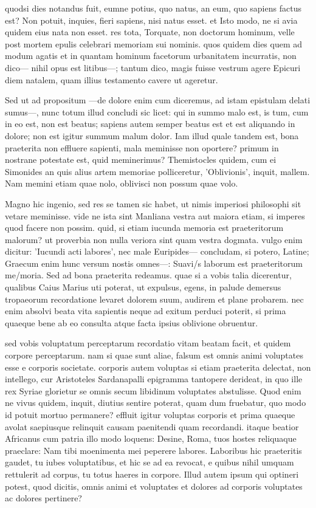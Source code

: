  quodsi dies notandus fuit, eumne potius, quo natus, an eum, quo sapiens factus est? Non potuit, inquies, fieri sapiens, nisi natus esset. et Isto modo, ne si avia quidem eius nata non esset. res tota, Torquate, non doctorum hominum, velle post mortem epulis celebrari memoriam sui nominis. quos quidem dies quem ad modum agatis et in quantam hominum facetorum urbanitatem incurratis, non dico— nihil opus est litibus—; tantum dico, magis fuisse vestrum agere Epicuri diem natalem, quam illius testamento cavere ut ageretur.

 Sed ut ad propositum —de dolore enim cum diceremus, ad istam epistulam delati sumus—, nunc totum illud concludi sic licet: qui in summo malo est, is tum, cum in eo est, non est beatus; sapiens autem semper beatus est et est aliquando in dolore; non est igitur summum malum dolor. Iam illud quale tandem est, bona praeterita non effluere sapienti, mala meminisse non oportere? primum in nostrane potestate est, quid meminerimus? Themistocles quidem, cum ei Simonides an quis alius artem memoriae polliceretur, 'Oblivionis', inquit, mallem. Nam memini etiam quae nolo, oblivisci non possum quae volo.

 Magno hic ingenio, sed res se tamen sic habet, ut nimis imperiosi philosophi sit vetare meminisse. vide ne ista sint Manliana vestra aut maiora etiam, si imperes quod facere non possim. quid, si etiam iucunda memoria est praeteritorum malorum? ut proverbia non nulla veriora sint quam vestra dogmata. vulgo enim dicitur: 'Iucundi acti labores', nec male Euripides— concludam, si potero, Latine; Graecum enim hunc versum nostis omnes—: Suavi/s laborum est praeteritorum me/moria. Sed ad bona praeterita redeamus. quae si a vobis talia dicerentur, qualibus Caius Marius uti poterat, ut expulsus, egens, in palude demersus tropaeorum recordatione levaret dolorem suum, audirem et plane probarem. nec enim absolvi beata vita sapientis neque ad exitum perduci poterit, si prima quaeque bene ab eo consulta atque facta ipsius oblivione obruentur.

 sed vobis voluptatum perceptarum recordatio vitam beatam facit, et quidem corpore perceptarum. nam si quae sunt aliae, falsum est omnis animi voluptates esse e corporis societate. corporis autem voluptas si etiam praeterita delectat, non intellego, cur Aristoteles Sardanapalli epigramma tantopere derideat, in quo ille rex Syriae glorietur se omnis secum libidinum voluptates abstulisse. Quod enim ne vivus quidem, inquit, diutius sentire poterat, quam dum fruebatur, quo modo id potuit mortuo permanere? effluit igitur voluptas corporis et prima quaeque avolat saepiusque relinquit causam paenitendi quam recordandi. itaque beatior Africanus cum patria illo modo loquens: Desine, Roma, tuos hostes reliquaque praeclare: Nam tibi moenimenta mei peperere labores. Laboribus hic praeteritis gaudet, tu iubes voluptatibus, et hic se ad ea revocat, e quibus nihil umquam rettulerit ad corpus, tu totus haeres in corpore. Illud autem ipsum qui optineri potest, quod dicitis, omnis animi et voluptates et dolores ad corporis voluptates ac dolores pertinere?

